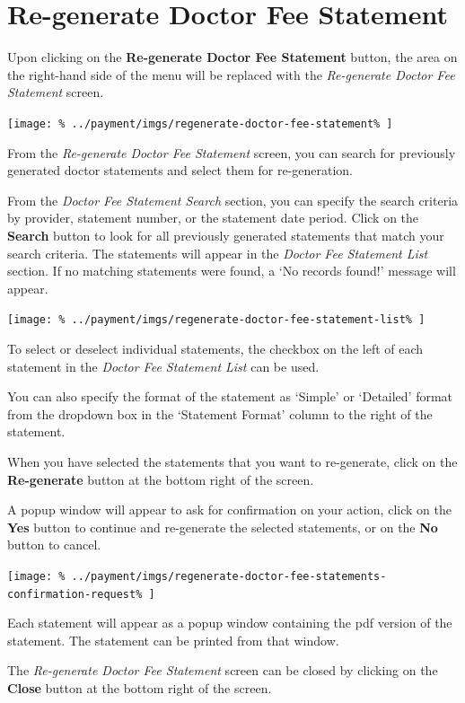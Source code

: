 \documentclass[../main/main]{subfiles}
\begin{document}
\newpage
\section{Re-generate Doctor Fee Statement}
\label{sec:re-generate-doctor-fee-statement}

Upon clicking on the \textbf{Re-generate Doctor Fee Statement} button,
the area on the right-hand side of the menu will be replaced with the
\emph{Re-generate Doctor Fee Statement} screen.

\texttt{[image: \%
  ../payment/imgs/regenerate-doctor-fee-statement\%
]}

From the \emph{Re-generate Doctor Fee Statement} screen, you can search for
previously generated doctor statements and select them for re-generation.

From the \emph{Doctor Fee Statement Search} section, you can specify the search
criteria by provider, statement number, or the statement date period. Click
on the \textbf{Search} button to look for all previously generated statements
that match your search criteria. The statements will appear in the
\emph{Doctor Fee Statement List} section.
If no matching statements were found, a `No records found!' message will appear.

\texttt{[image: \%
  ../payment/imgs/regenerate-doctor-fee-statement-list\%
]}

To select or deselect individual statements, the checkbox on the left of each
statement in the \emph{Doctor Fee Statement List} can be used.

You can also specify the format of the statement as `Simple' or `Detailed'
format from the dropdown box in the `Statement Format' column to the right
of the statement.

When you have selected the statements that you want to re-generate,
click on the \textbf{Re-generate} button at the bottom right of the
screen.

A popup window will appear to ask for confirmation on your action, click on the
\textbf{Yes} button to continue and re-generate the selected statements, or on
the \textbf{No} button to cancel.

\texttt{[image: \%
  ../payment/imgs/regenerate-doctor-fee-statements-confirmation-request\%
]}

Each statement will appear as a popup window containing the pdf version of
the statement. The statement can be printed from that window.

The \emph{Re-generate Doctor Fee Statement} screen can be closed by clicking on
the \textbf{Close} button at the bottom right of the screen.
\end{document}
